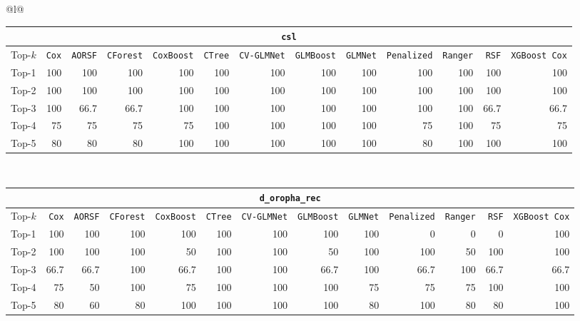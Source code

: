 \begin{longtable}{@{}l@{}}
\begin{tabular}{@{}l*{12}{r}@{}}
\multicolumn{13}{c}{\texttt{csl}} \\
\midrule
Top-$k$ & \texttt{Cox} & \texttt{AORSF} & \texttt{CForest} & \texttt{CoxBoost} & \texttt{CTree} & \texttt{CV-GLMNet} & \texttt{GLMBoost} & \texttt{GLMNet} & \texttt{Penalized} & \texttt{Ranger} & \texttt{RSF} & \texttt{XGBoost Cox} \\
\midrule
Top-1 & 100 & 100 & 100 & 100 & 100 & 100 & 100 & 100 & 100 & 100 & 100 & 100 \\
Top-2 & 100 & 100 & 100 & 100 & 100 & 100 & 100 & 100 & 100 & 100 & 100 & 100 \\
Top-3 & 100 & 66.7 & 66.7 & 100 & 100 & 100 & 100 & 100 & 100 & 100 & 66.7 & 66.7 \\
Top-4 & 75 & 75 & 75 & 75 & 100 & 100 & 100 & 100 & 75 & 100 & 75 & 75 \\
Top-5 & 80 & 80 & 80 & 100 & 100 & 100 & 100 & 100 & 80 & 100 & 100 & 100 \\
\end{tabular} \\
\midrule

\begin{tabular}{@{}l*{12}{r}@{}}
\multicolumn{13}{c}{\texttt{d_oropha_rec}} \\
\midrule
Top-$k$ & \texttt{Cox} & \texttt{AORSF} & \texttt{CForest} & \texttt{CoxBoost} & \texttt{CTree} & \texttt{CV-GLMNet} & \texttt{GLMBoost} & \texttt{GLMNet} & \texttt{Penalized} & \texttt{Ranger} & \texttt{RSF} & \texttt{XGBoost Cox} \\
\midrule
Top-1 & 100 & 100 & 100 & 100 & 100 & 100 & 100 & 100 & 0 & 0 & 0 & 100 \\
Top-2 & 100 & 100 & 100 & 50 & 100 & 100 & 50 & 100 & 100 & 50 & 100 & 100 \\
Top-3 & 66.7 & 66.7 & 100 & 66.7 & 100 & 100 & 66.7 & 100 & 66.7 & 100 & 66.7 & 66.7 \\
Top-4 & 75 & 50 & 100 & 75 & 100 & 100 & 100 & 75 & 75 & 75 & 100 & 100 \\
Top-5 & 80 & 60 & 80 & 100 & 100 & 100 & 100 & 80 & 100 & 80 & 80 & 100 \\
\end{tabular} \\
\midrule


\end{longtable}
